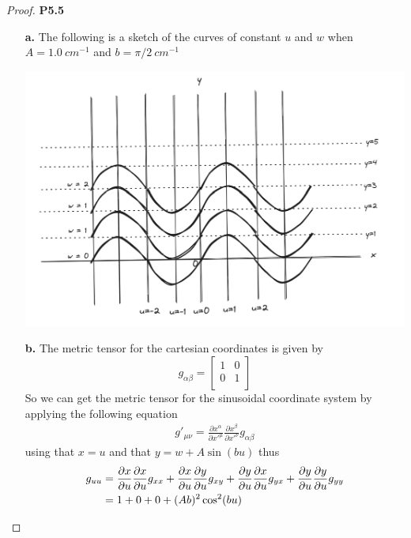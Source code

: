 \documentclass[11pt]{article}
\theoremstyle{definition}
\begin{document}
\begin{proof}{\textbf{P5.5}}
    \begin{itemize}
        \item [\bf{a.}] The following is a sketch of the curves of constant
        $u$ and $w$ when $A = 1.0~cm^{-1}$ and $b = \pi/2~cm^{-1}$
        \begin{center}
            \includegraphics*[scale=0.4]{ch5_p5.5.png}
        \end{center}
        \item[\bf{b.}] The metric tensor for the cartesian coordinates is given by
        $$g_{\alpha\beta} = \begin{bmatrix}
            1 & 0\\
            0 & 1\\
        \end{bmatrix}$$
        So we can get the metric tensor for the sinusoidal coordinate system
        by applying the following equation
        \begin{align*}
            g'_{\mu\nu} = \frac{\partial x^\alpha}{\partial x'^\mu}
            \frac{\partial x^\beta}{\partial x'^\nu} g_{\alpha\beta}
        \end{align*}
        using that $x = u$ and that $y = w + A\sin(bu)$ thus
        \begin{align*}
            g_{uu} &=
            \partialderivative{x}{u}\partialderivative{x}{u}g_{xx}
            + \partialderivative{x}{u}\partialderivative{y}{u}g_{xy}
            + \partialderivative{y}{u}\partialderivative{x}{u}g_{yx}
            + \partialderivative{y}{u}\partialderivative{y}{u}g_{yy}\\
            &= 1 + 0 + 0 + (Ab)^2\cos^2(bu)\\

\end{align*}
\end{itemize}
\end{proof}
\end{document}
